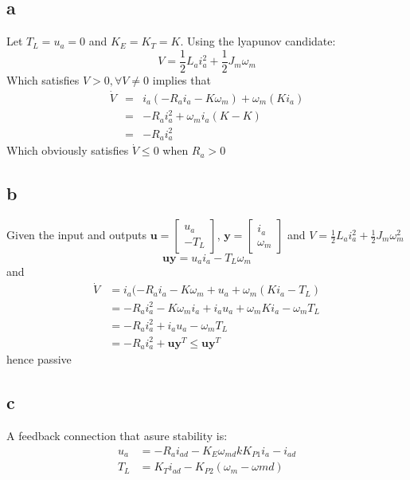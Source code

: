\documentclass[11pt]{article}
\begin{document}
\subsection*{a}
Let $T_L = u_a = 0$ and $K_E = K_T = K$. Using the lyapunov candidate:
\[V = \frac{1}{2} L_a i_a^2 + \frac{1}{2} J_m \omega_m\]
Which satisfies $V > 0, \forall V \not = 0$ implies that
\begin{eqnarray*}
\dot{V} &=& i_a(-R_a i_a - K \omega_m) + \omega_m(K i_a) \\
&=& -R_a i_a^2 + \omega_m i_a (K - K) \\
&=& -R_a i_a^2
\end{eqnarray*}
Which obviously satisfies $\dot{V} \leq 0$ when $R_a > 0$

\subsection*{b}
Given the input and outputs $\mathbf{u} = \begin{bmatrix} u_a \\ -T_L \end{bmatrix}$, $\mathbf{y} = \begin{bmatrix} i_a \\ \omega_m \end{bmatrix}$ and $V = \frac{1}{2} L_a i_a^2 + \frac{1}{2} J_m \omega_m^2$
\[\mathbf{u} \mathbf{y} = u_a i_a - T_L \omega_m\]
and
\begin{eqnarray*}
\dot{V} &= i_a(-R_a i_a - K \omega_m + u_a + \omega_m ( K i_a - T_L) \\
&= - R_a i_a^2 - K \omega_m i_a + i_a u_a + \omega_m K i_a - \omega_m T_L \\
&= - R_a i_a^2 + i_a u_a - \omega_m T_L \\
&= - R_a i_a^2 + \mathbf{u} \mathbf{y}^T \leq \mathbf{u} \mathbf{y}^T
\end{eqnarray*}
hence passive

\subsection*{c}
A feedback connection that asure stability is:
\begin{eqnarray*}
u_a &= - R_a i_{ad} - K_E \omega_{md} k K_{P1}{i_a - i_{ad}} \\
T_L &= K_T i_{ad} - K_{P2}(\omega_m - \omega{md})
\end{eqnarray*}
\end{document}
